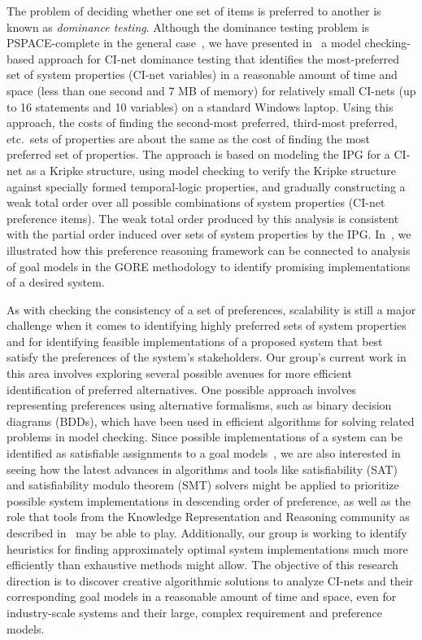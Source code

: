 The problem of deciding whether one set of items is preferred to another is known as \emph{dominance testing}. Although the dominance testing problem is PSPACE-complete in the general case~\cite{Bouveret:IJCAI2009}, we have presented in~\cite{Oster:FACS12} a model checking-based approach for CI-net dominance testing that identifies the most-preferred set of system properties (CI-net variables) in a reasonable amount of time and space (less than one second and 7 MB of memory) for relatively small CI-nets (up to 16 statements and 10 variables) on a standard Windows laptop. Using this approach, the costs of finding the second-most preferred, third-most preferred, etc.~sets of properties are about the same as the cost of finding the most preferred set of properties. The approach is based on modeling the IPG for a CI-net as a Kripke structure, using model checking to verify the Kripke structure against specially formed temporal-logic properties, and gradually constructing a weak total order over all possible combinations of system properties (CI-net preference items). The weak total order produced by this analysis is consistent with the partial order induced over sets of system properties by the IPG. In~\cite{Oster:ASE11}, we illustrated how this preference reasoning framework can be connected to analysis of goal models in the GORE methodology to identify promising implementations of a desired system.

As with checking the consistency of a set of preferences, scalability is still a major challenge when it comes to identifying highly preferred sets of system properties and for identifying feasible implementations of a proposed system that best satisfy the preferences of the system's stakeholders. Our group's current work in this area involves exploring several possible avenues for more efficient identification of preferred alternatives. One possible approach involves representing preferences using alternative formalisms, such as binary decision diagrams (BDDs), which have been used in efficient algorithms for solving related problems in model checking. Since possible implementations of a system can be identified as satisfiable assignments to a goal models~\cite{Mylopoulos:CAiSE04}, we are also interested in seeing how the latest advances in algorithms and tools like satisfiability (SAT) and satisfiability modulo theorem (SMT) solvers might be applied to prioritize possible system implementations in descending order of preference, as well as the role that tools from the Knowledge Representation and Reasoning community as described in~\cite{Borgida:AIRE14} may be able to play. Additionally, our group is working to identify heuristics for finding approximately optimal system implementations much more efficiently than exhaustive methods might allow. The objective of this research direction is to discover creative algorithmic solutions to analyze CI-nets and their corresponding goal models in a reasonable amount of time and space, even for industry-scale systems and their large, complex requirement and preference models. 

